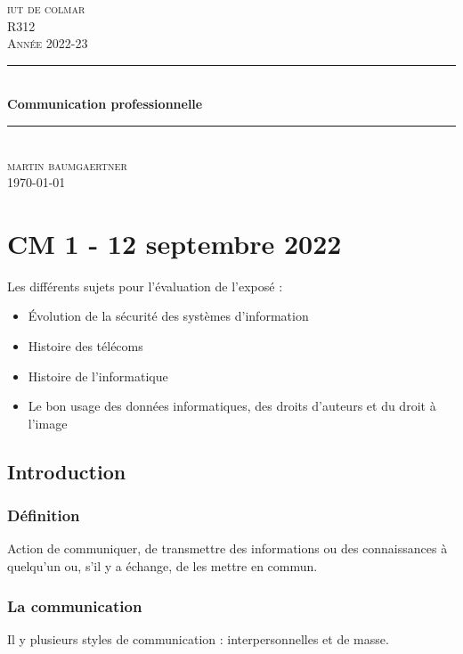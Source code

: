 \documentclass[12pt, a4paper]{article}
\begin{document}
\begin{titlepage}
	\newcommand{\HRule}{\rule{\linewidth}{0.5mm}} 
	\center 
	\textsc{\LARGE iut de colmar}\\[6.5cm] 
	\textsc{\Large R312}\\[0.5cm] 
	\textsc{\large Année 2022-23}\\[0.5cm]
	\HRule\\[0.75cm]
	{\huge\bfseries Communication professionnelle}\\[0.4cm]
	\HRule\\[1.5cm]
	\textsc{\large martin baumgaertner}\\[6.5cm] 

	\vfill\vfill\vfill
	{\large\today} 
	\vfill
\end{titlepage}
\newpage
\tableofcontents
\newpage
\section{CM 1 - 12 septembre 2022}

Les différents sujets pour l'évaluation de l'exposé :\\
\begin{itemize}
    \item Évolution de la sécurité des systèmes d'information
    \item Histoire des télécoms
    \item Histoire de l'informatique 
    \item Le bon usage des données informatiques, des droits d'auteurs et du 
    droit à l'image 
\end{itemize}

\subsection{Introduction}
\subsubsection{Définition}
Action de communiquer, de transmettre des informations ou des connaissances
à quelqu'un ou, s'il y a échange, de les mettre en commun.\\

\subsubsection{La communication}
Il y plusieurs styles de communication : interpersonnelles et de masse. 
\end{document}
